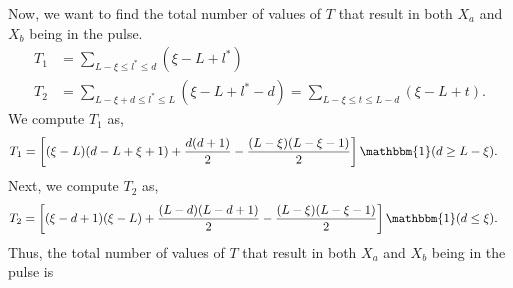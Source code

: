 \documentclass{article}
\begin{document}
Now, we want to find the total number of values of $T$ that result in both $X_a$ and $X_b$ being in the pulse.
\begin{align}
  T_1 
  &= \sum_{ L - \xi \leq l^* \leq d } (\xi - L + l^*) \label{eq:T1} \\
  T_2
  &= \sum_{ L - \xi + d \leq l^* \leq L } (\xi - L + l^* - d)
  = \sum_{ L - \xi \leq t \leq L - d } (\xi - L + t). \label{eq:T2}
\end{align}
We compute $T_1$ as,
\begin{align*}
  T_1
  &= \left[ (\xi - L) (d - L + \xi + 1) + \frac{d(d+1)}{2} - \frac{(L-\xi)(L-\xi-1)}{2} \right] \mathbbm{1}(d \geq L - \xi).
\end{align*}
Next, we compute $T_2$ as,
\begin{align*}
  T_2
  &= \left[ (\xi - d + 1) (\xi - L) + \frac{(L-d)(L-d+1)}{2} - \frac{(L-\xi)(L-\xi-1)}{2} \right] \mathbbm{1}(d \leq \xi).
\end{align*}
Thus, the total number of values of $T$ that result in both $X_a$ and $X_b$ being in the pulse is
\end{document}
